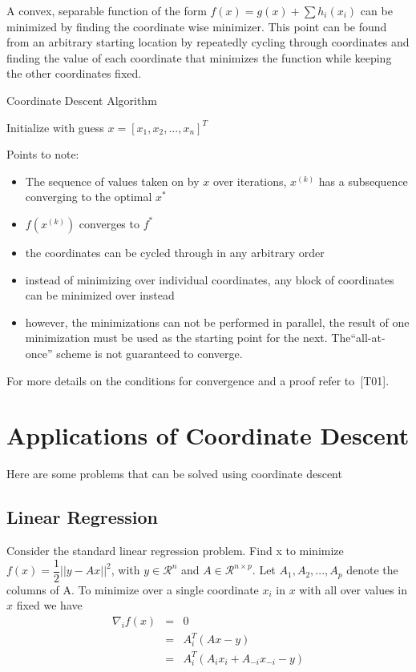 \documentclass[twoside]{article}
\renewcommand{\cite}[1]{[#1]}
\begin{document}
A convex, separable function of the form $f(x) = g(x) + \sum h_i(x_i)$ can be minimized by finding the coordinate wise minimizer. This point can be found from an arbitrary starting location by repeatedly cycling through coordinates and finding the value of each coordinate that minimizes the function while keeping the other coordinates fixed.

\begin{algorithm}
\caption{Coordinate Descent Algorithm}
\begin{algorithmic}
\STATE Initialize with guess $x = [x_1, x_2,...,x_n]^T $

 
\end{algorithmic}
\end{algorithm}

Points to note:
\begin{itemize}
\item The sequence of values taken on by $x$ over iterations, $x^{(k)}$ has a subsequence converging to the optimal $x^{*}$
\item $f(x^{(k)})$ converges to $f^{*}$
\item the coordinates can be cycled through in any arbitrary order
\item instead of minimizing over individual coordinates, any block of coordinates can be minimized over instead
\item however, the minimizations can not be performed in parallel, the result of one minimization must be used as the starting point for the next. The``all-at-once'' scheme is not guaranteed to converge.
\end{itemize}

For more details on the conditions for convergence and a proof refer to~\cite{T01}.

\section{Applications of Coordinate Descent}
Here are some problems that can be solved using coordinate descent

\subsection{Linear Regression}

Consider the standard linear regression problem. Find x to minimize $f(x) = \dfrac{1}{2}||y-Ax||^2$, with $y \in \mathcal{R}^n$ and $A \in \mathcal{R}^{n\times p}$. Let $A_1, A_2, ..., A_p$ denote the columns of A.
To minimize over a single coordinate $x_i$ in $x$ with all over values in $x$ fixed we have
\begin{eqnarray*}
\nabla_i f(x) &= & 0           \\
              & = & A_i^T(Ax-y)\\
              & = & A_i^T(A_ix_i + A_{-i}x_{-i}-y) \\
\end{eqnarray*}
\end{document}
